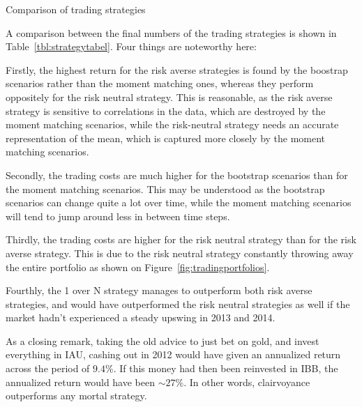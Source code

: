 \begin{table}[tpb]
\caption{Comparison of trading strategies}\label{tbl:strategytabel}
\centering

\end{table}


A comparison between the final numbers of the trading strategies is shown in Table~\ref{tbl:strategytabel}.
Four things are noteworthy here:

Firstly, the highest return for the risk averse strategies is found by the boostrap scenarios rather than the moment matching ones, whereas they perform oppositely for the risk neutral strategy.
This is reasonable, as the risk averse strategy is sensitive to correlations in the data, which are destroyed by the moment matching scenarios, while the risk-neutral strategy needs an accurate representation of the mean, which is captured more closely by the moment matching scenarios.

Secondly, the trading costs are much higher for the bootstrap scenarios than for the moment matching scenarios.
This may be understood as the bootstrap scenarios can change quite a lot over time, while the moment matching scenarios will tend to jump around less in between time steps.

Thirdly, the trading costs are higher for the risk neutral strategy than for the risk averse strategy. This is due to the risk neutral strategy constantly throwing away the entire portfolio as shown on Figure~\ref{fig:tradingportfolios}.

Fourthly, the 1 over N strategy manages to outperform both risk averse strategies, and would have outperformed the risk neutral strategies as well if the market hadn't experienced a steady upswing in 2013 and 2014.

As a closing remark, taking the old advice to just bet on gold, and invest everything in IAU, cashing out in 2012 would have given an annualized return across the period of $9.4 \%$. If this money had then been reinvested in IBB, the annualized return would have been $\sim 27 \%$.
In other words, clairvoyance outperforms any mortal strategy.